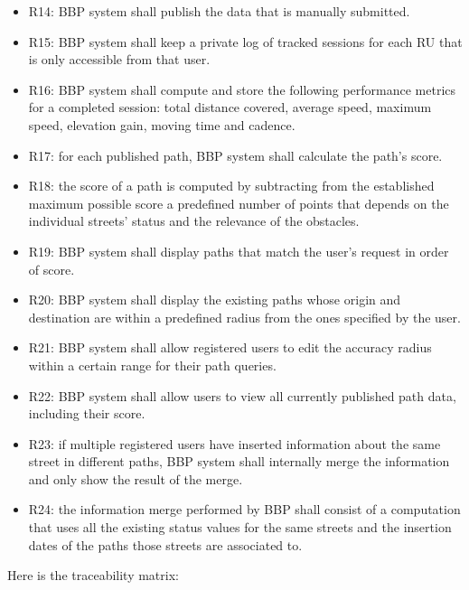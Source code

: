 \begin{itemize}
    \item R14: BBP system shall publish the data that is manually submitted.
    \item R15: BBP system shall keep a private log of tracked sessions for each RU that is only accessible from that user.
    \item R16: BBP system shall compute and store the following performance metrics for a completed session: total distance covered, average speed, maximum speed, elevation gain, moving time and cadence.
    \item R17: for each published path, BBP system shall calculate the path's score.
    \item R18: the score of a path is computed by subtracting from the established maximum possible score a predefined number of points that depends on the individual streets' status and the relevance of the obstacles.
    \item R19: BBP system shall display paths that match the user's request in order of score.
    \item R20: BBP system shall display the existing paths whose origin and destination are within a predefined radius from the ones specified by the user.
    \item R21: BBP system shall allow registered users to edit the accuracy radius within a certain range for their path queries.
    \item R22: BBP system shall allow users to view all currently published path data, including their score.
    \item R23: if multiple registered users have inserted information about the same street in different paths, BBP system shall internally merge the information and only show the result of the merge.
    \item R24: the information merge performed by BBP shall consist of a computation that uses all the existing status values for the same streets and the insertion dates of the paths those streets are associated to.
\end{itemize}

Here is the traceability matrix:

